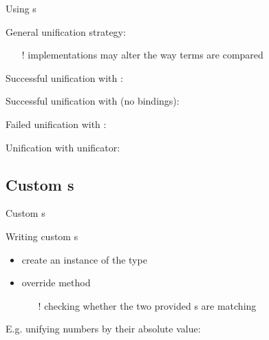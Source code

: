 \documentclass[handout]{beamer}
\begin{document}
\begin{frame}{Using s}

    General unification strategy:
    \bigskip
    
    \bigskip
    \begin{itemize}
        \item[!] implementations may alter the way terms are compared
    \end{itemize}

    \framebreak

    Successful unification with :

    \framebreak

    Successful unification with  (no bindings):

    \framebreak

    Failed unification with :

    \framebreak

    Unification with  unificator:

\end{frame}

\subsection{Custom s}

\begin{frame}{Custom s}
    \begin{block}{Writing custom s}
        \begin{itemize}
            \item create an instance of the  type
            \item override  method
            \begin{itemize}
                \item[!] checking whether the two provided s are matching
            \end{itemize}
        \end{itemize}
    \end{block}

    \framebreak

    E.g. unifying numbers by their absolute value:

\end{frame}
\end{document}
